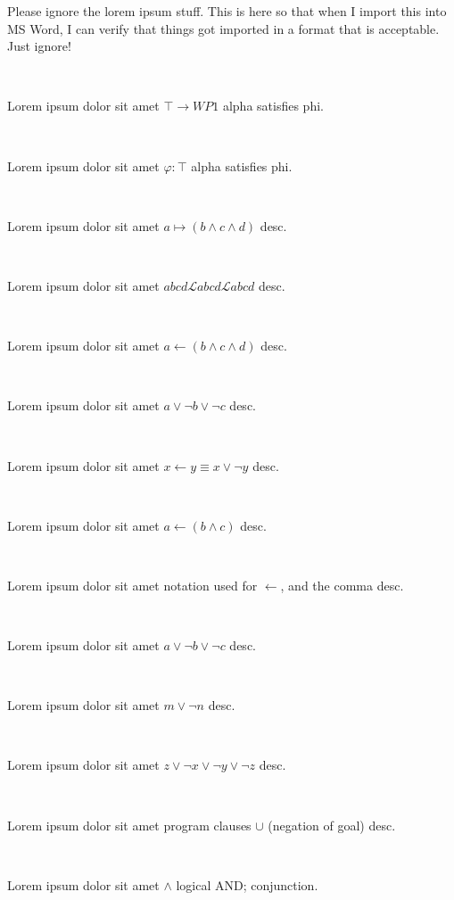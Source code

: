\documentclass[12pt]{article}
\begin{document}
Please ignore the lorem ipsum stuff. This is here so that when I import this into MS Word, I can verify that things got imported in a format that is acceptable.  Just ignore!


\centerline{~}

Lorem ipsum dolor sit amet $ \top \rightarrow WP1 $ alpha satisfies phi.

\centerline{~}

Lorem ipsum dolor sit amet $ \varphi : \top $ alpha satisfies phi.

\centerline{~}

Lorem ipsum dolor sit amet $ a \mapsto ( b \wedge c \wedge d )  $ desc.

\centerline{~}

Lorem ipsum dolor sit amet $ abcd \mathscr{L} abcd \mathcal{L}  abcd $ desc.

\centerline{~}

Lorem ipsum dolor sit amet $ a \leftarrow ( b \wedge c \wedge d )  $ desc.

\centerline{~}

Lorem ipsum dolor sit amet $ a \vee \neg b \vee \neg c $ desc.

\centerline{~}

Lorem ipsum dolor sit amet $ x \leftarrow y \equiv x \vee \neg y $ desc.

\centerline{~}

Lorem ipsum dolor sit amet $ a \leftarrow ( b \wedge c ) $ desc.

\centerline{~}

Lorem ipsum dolor sit amet notation used for $ \leftarrow $, and the comma  desc.

\centerline{~}

Lorem ipsum dolor sit amet $ a \vee \neg b \vee \neg c $ desc.

\centerline{~}

Lorem ipsum dolor sit amet $ m \vee \neg n $ desc.

\centerline{~}

Lorem ipsum dolor sit amet $ z \vee \neg x \vee \neg y \vee \neg z $ desc.

\centerline{~}

Lorem ipsum dolor sit amet program clauses $ \cup $ (negation of goal) desc.


\centerline{~}

Lorem ipsum dolor sit amet $ \wedge $ logical AND; conjunction.

\centerline{~}
\end{document}
